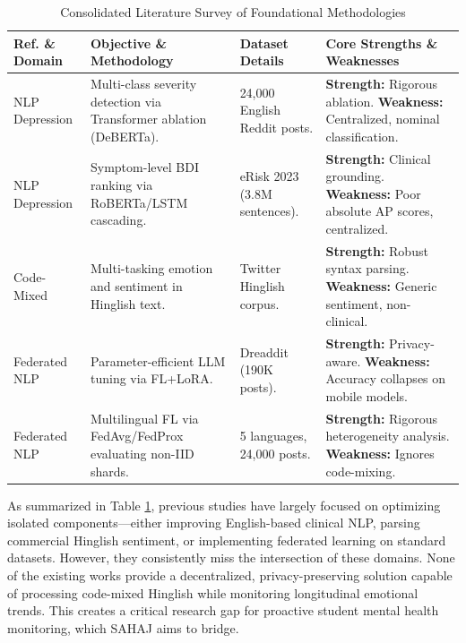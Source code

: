 \documentclass[conference]{IEEEtran}
\begin{document}
\begin{table}[t]
\caption{Consolidated Literature Survey of Foundational Methodologies}
\label{tab:lit_survey}
\begin{center}
\begin{tabularx}{\textwidth}{l X X X}
\toprule
\textbf{Ref. \& Domain} & \textbf{Objective \& Methodology} & \textbf{Dataset Details} & \textbf{Core Strengths \& Weaknesses} \\
\midrule
\cite{b4} NLP Depression & Multi-class severity detection via Transformer ablation (DeBERTa). & 24,000 English Reddit posts. & \textbf{Strength:} Rigorous ablation. \textbf{Weakness:} Centralized, nominal classification. \\
\cite{b3} NLP Depression & Symptom-level BDI ranking via RoBERTa/LSTM cascading. & eRisk 2023 (3.8M sentences). & \textbf{Strength:} Clinical grounding. \textbf{Weakness:} Poor absolute AP scores, centralized. \\
\cite{b8} Code-Mixed & Multi-tasking emotion and sentiment in Hinglish text. & Twitter Hinglish corpus. & \textbf{Strength:} Robust syntax parsing. \textbf{Weakness:} Generic sentiment, non-clinical. \\
\cite{b2} Federated NLP & Parameter-efficient LLM tuning via FL+LoRA. & Dreaddit (190K posts). & \textbf{Strength:} Privacy-aware. \textbf{Weakness:} Accuracy collapses on mobile models. \\
\cite{b6} Federated NLP & Multilingual FL via FedAvg/FedProx evaluating non-IID shards. & 5 languages, 24,000 posts. & \textbf{Strength:} Rigorous heterogeneity analysis. \textbf{Weakness:} Ignores code-mixing. \\
\bottomrule
\end{tabularx}
\end{center}
\end{table}

As summarized in Table \ref{tab:lit_survey}, previous studies have largely focused on optimizing isolated components---either improving English-based clinical NLP, parsing commercial Hinglish sentiment, or implementing federated learning on standard datasets. However, they consistently miss the intersection of these domains. None of the existing works provide a decentralized, privacy-preserving solution capable of processing code-mixed Hinglish while monitoring longitudinal emotional trends. This creates a critical research gap for proactive student mental health monitoring, which SAHAJ aims to bridge.
\end{document}
